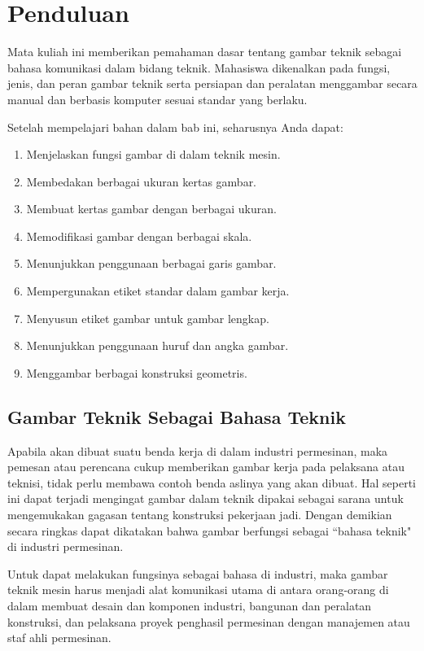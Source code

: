 \documentclass[../menggambarteknik.tex]{subfiles}
\begin{document}
\section{Penduluan}%
\label{sec:Penduluan}

Mata kuliah ini memberikan pemahaman dasar tentang gambar teknik sebagai bahasa komunikasi dalam bidang teknik. Mahasiswa dikenalkan pada fungsi, jenis, dan peran gambar teknik serta persiapan dan peralatan menggambar secara manual dan berbasis komputer sesuai standar yang berlaku.

Setelah mempelajari bahan dalam bab ini, seharusnya Anda dapat:
\begin{enumerate}
	\item Menjelaskan fungsi gambar di dalam teknik mesin.
	\item Membedakan berbagai ukuran kertas gambar.
	\item Membuat kertas gambar dengan berbagai ukuran.
	\item Memodifikasi gambar dengan berbagai skala.
	\item Menunjukkan penggunaan berbagai garis gambar.
	\item Mempergunakan etiket standar dalam gambar kerja.
	\item Menyusun etiket gambar untuk gambar lengkap.
	\item Menunjukkan penggunaan huruf dan angka gambar.
	\item Menggambar berbagai konstruksi geometris.
\end{enumerate}

\subsection{Gambar Teknik Sebagai Bahasa Teknik}%
\label{sub:Gambar Teknik Sebagai Bahasa Teknik}

Apabila akan dibuat suatu benda kerja di dalam industri permesinan, maka pemesan atau perencana cukup memberikan gambar kerja pada pelaksana atau teknisi, tidak perlu membawa contoh benda aslinya yang akan dibuat. Hal seperti ini dapat terjadi mengingat gambar dalam teknik dipakai sebagai sarana untuk mengemukakan gagasan tentang konstruksi pekerjaan jadi. Dengan demikian secara ringkas dapat dikatakan bahwa gambar berfungsi sebagai ``bahasa teknik" di industri permesinan.

Untuk dapat melakukan fungsinya sebagai bahasa di industri, maka gambar teknik mesin harus menjadi alat komunikasi utama di antara orang-orang di dalam membuat desain dan komponen industri, bangunan dan peralatan konstruksi, dan pelaksana proyek penghasil permesinan dengan manajemen atau staf ahli permesinan.
\end{document}

